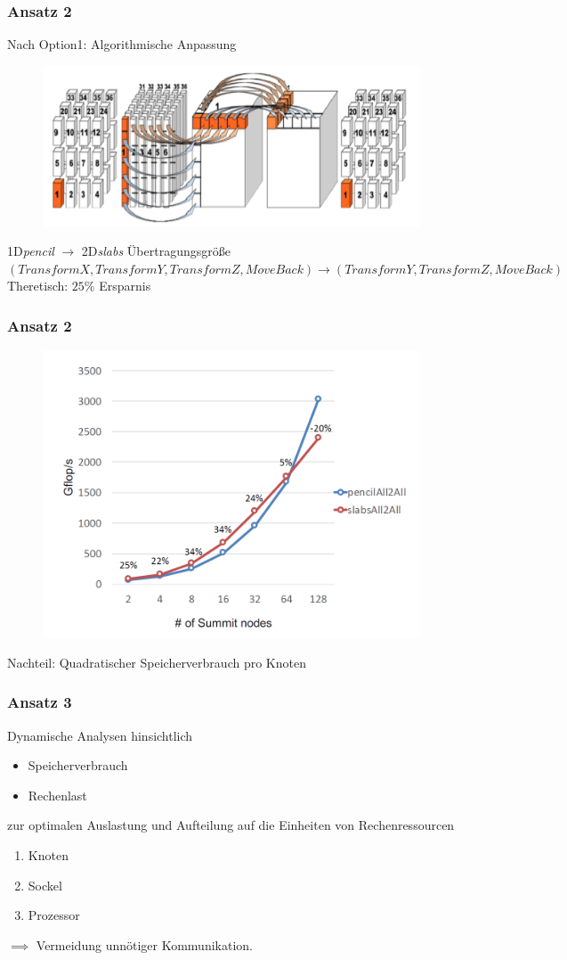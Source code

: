 {
	\frametitle{Ansatz 2}
	Nach Option1: Algorithmische Anpassung
	\begin{figure}[h!]
		\centering
		\includegraphics[width=0.7\linewidth, keepaspectratio]{../res/algo.png}
		\footnotemark[1]
	\end{figure}
	1D\textit{pencil} $\rightarrow$ 2D\textit{slabs} Übertragungsgröße
	$(TransformX,TransformY,TransformZ,MoveBack)\rightarrow(TransformY,TransformZ,MoveBack)$
	Theretisch: $25\%$ Ersparnis

}

\frame
{
	\frametitle{Ansatz 2}
	\begin{figure}[h!]
		\centering
		\includegraphics[width=0.7\linewidth, keepaspectratio]{../res/bench2.png}
		\footnotemark[1]
	\end{figure}
	Nachteil: Quadratischer Speicherverbrauch pro Knoten
	
}
\frame
{
	\frametitle{Ansatz 3}
	Dynamische Analysen hinsichtlich
	\begin{itemize}
		\item Speicherverbrauch
		\item Rechenlast
	\end{itemize}
	zur optimalen Auslastung und Aufteilung auf die Einheiten von Rechenressourcen 
	\begin{enumerate}
		\item{Knoten}
		\item{Sockel}
		\item{Prozessor}
	\end{enumerate}
	$\implies$ Vermeidung unnötiger Kommunikation.
}
